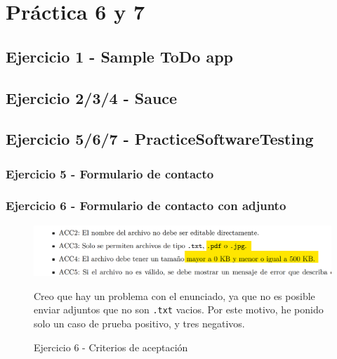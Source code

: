 \chapter{Práctica 6 y 7}

\lstset{language=python}
\lstset{captionpos=t}

\section{Ejercicio 1 - Sample ToDo app}



\newpage

\section{Ejercicio 2/3/4 - Sauce}



\newpage

\section{Ejercicio 5/6/7 - PracticeSoftwareTesting}

\subsection{Ejercicio 5 - Formulario de contacto}



\newpage
\subsection{Ejercicio 6 - Formulario de contacto con adjunto}
\begin{figure}[htbp]
  \centering
  \includegraphics{images/ejercicio6.png}
  \caption{Ejercicio 6 - Criterios de aceptación}
  \label{fig:ejercicio6}
  Creo que hay un problema con el enunciado, ya que no es posible enviar adjuntos que no son \texttt{.txt} vacios.
  Por este motivo, he ponido solo un caso de prueba positivo, y tres negativos.
\end{figure}



